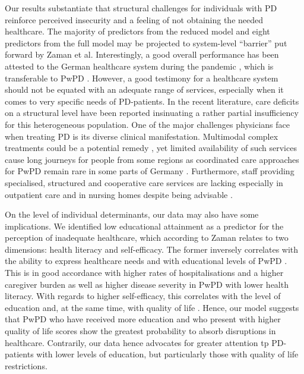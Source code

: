 \documentclass[a4paper,oneside,11pt,english]{scrartcl}
\begin{document}
Our results substantiate that structural challenges for individuals with \textsc{PD} reinforce perceived insecurity and a feeling of not obtaining the needed healthcare. The majority of predictors from the reduced model and eight predictors from the full model may be projected to system-level ``barrier'' put forward by Zaman et al. Interestingly, a good overall performance has been attested to the German healthcare system during the pandemic \cite{10665-341674}, which is transferable to Pw\textsc{PD} \cite{frundt2022impact}. However, a good testimony for a healthcare system should not be equated with an adequate range of services, especially when it comes to very specific needs of \textsc{PD}-patients. In the recent literature, care deficits on a structural level have been reported insinuating a rather partial insufficiency \cite{richter2019dynamics,van2020building, prell2020specialized, deuschl2016s3} for this heterogeneous population. One of the major challenges physicians face when treating \textsc{PD} is its diverse clinical manifestation. Multimodal complex treatments could be a potential remedy \cite{richter2019dynamics}, yet limited availability of such services cause long journeys for people from some regions \cite{richter2019dynamics} as coordinated care approaches for Pw\textsc{PD} remain rare in some parts of Germany \cite{van2020building}. Furthermore, staff providing specialised, structured and cooperative care services are lacking especially in outpatient care and in nursing homes \cite{prell2020specialized} despite being advisable \cite{radder2020recommendations, deuschl2016s3}.

On the level of individual determinants, our data may also have some implications. We identified low educational attainment as a predictor for the perception of inadequate healthcare, which according to Zaman \cite{zaman2021barriers} relates to two dimensions: health literacy and self-efficacy. The former inversely correlates with the ability to express healthcare needs \cite{davis2003variability, hurt2019barriers} and with educational levels of Pw\textsc{PD} \cite{fleisher2016associations}. This is in good accordance with higher rates of hospitalisations and a higher caregiver burden \cite{fleisher2016associations} as well as higher disease severity \cite{fleisher2016associations} in Pw\textsc{PD} with lower health literacy. With regards to higher self-efficacy, this correlates with the level of education\cite{lim2020factors} and, at the same time, with quality of life \cite{rostagni2022gratitude, lim2020factors}. Hence, our model suggests that Pw\textsc{PD} who have received more education and who present with higher quality of life scores show the greatest probability to absorb disruptions in healthcare. Contrarily, our data hence advocates for greater attention tp \textsc{PD}-patients with lower levels of education, but particularly those with quality of life restrictions.
\end{document}
